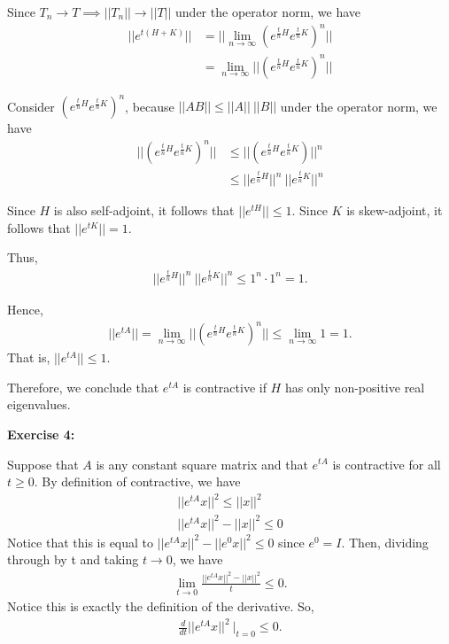 \documentclass[12pt]{article}
\begin{document}
Since $T_n \rightarrow T \implies ||T_n|| \rightarrow ||T||$ under the operator norm, we have
\begin{align*}
    ||e^{t(H+K)}|| & = ||\lim_{n\rightarrow{\infty}}(e^{\frac{t}{n}H}e^{\frac{t}{n}K})^n||  \\
                   & = \lim_{n\rightarrow{\infty}} ||(e^{\frac{t}{n}H}e^{\frac{t}{n}K})^n||
\end{align*}

Consider $(e^{\frac{t}{n}H}e^{\frac{t}{n}K})^n$, because $||AB|| \leq ||A||~||B||$ under the operator norm, we have
\begin{align*}
    ||(e^{\frac{t}{n}H}e^{\frac{t}{n}K})^n|| & \leq ||(e^{\frac{t}{n}H}e^{\frac{t}{n}K})||^n        \\
                                             & \leq ||e^{\frac{t}{n}H}||^n ~ ||e^{\frac{t}{n}K}||^n
\end{align*}

Since $H$ is also self-adjoint, it follows that $||e^{tH}|| \leq 1$.
Since $K$ is skew-adjoint, it follows that $||e^{tK}|| = 1$.

Thus,
\begin{align*}
    ||e^{\frac{t}{n}H}||^n ~ ||e^{\frac{t}{n}K}||^n \leq 1^n \cdot 1^n = 1.
\end{align*}

Hence,
\begin{align*}
    ||e^{tA}|| = \lim_{n\rightarrow{\infty}} ||(e^{\frac{t}{n}H}e^{\frac{t}{n}K})^n|| \leq \lim_{n\rightarrow{\infty}} 1 = 1.
\end{align*}
That is, $||e^{tA}||  \leq 1$.

Therefore, we conclude that $e^{tA}$ is contractive if $H$ has only non-positive real eigenvalues.

\noindent{}\textbf{Exercise 4:}

Suppose that $A$ is any constant square matrix and that $e^{tA}$ is contractive for all $t \geq 0$.
By definition of contractive, we have
\begin{align*}
    ||e^{tA}x||^2 \leq ||x||^2 \\
    ||e^{tA}x||^2 - ||x||^2 \leq 0
\end{align*}
Notice that this is equal to $||e^{tA}x||^2 - ||e^{0}x||^2 \leq 0$ since $e^{0}=I$.
Then, dividing through by t and taking $t \rightarrow 0$, we have
\begin{align*}
    \lim_{t \rightarrow 0} \frac{||e^{tA}x||^2 - ||x||^2}{t} \leq 0.
\end{align*}
Notice this is exactly the definition of the derivative. So,
\begin{align*}
    \frac{d}{dt} ||e^{tA}x||^2 ~\big|_{t=0} \leq 0.
\end{align*}
\end{document}
